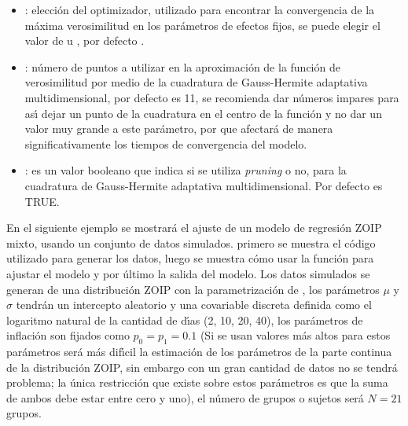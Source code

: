 \begin{itemize}[noitemsep, nolistsep]
.
\item {}: elecci\'{o}n del optimizador, utilizado para encontrar la convergencia de la m\'{a}xima verosimilitud en los par\'{a}metros de efectos fijos, se puede elegir el valor de  u , por defecto .
\item {}: n\'{u}mero de puntos a utilizar en la aproximaci\'{o}n de la funci\'{o}n de ve\-ro\-si\-mi\-li\-tud por medio de la cuadratura de Gauss-Hermite adaptativa multidimensional, por defecto es 11, se recomienda dar n\'{u}meros impares para as\'{\i} dejar un punto de la cuadratura en el centro de la funci\'{o}n y no dar un valor muy grande a este par\'{a}metro, por que afectar\'{a} de manera significativamente los tiempos de convergencia del modelo.
\item {}: es un valor booleano que indica si se utiliza \textit{pruning} o no, para la cuadratura de Gauss-Hermite adaptativa multidimensional. Por defecto es TRUE.
\end{itemize}
En el siguiente ejemplo se mostrar\'{a} el ajuste de un modelo de regresi\'{o}n ZOIP mixto, usando un conjunto de datos simulados. primero se muestra el c\'{o}digo utilizado para generar los datos, luego se muestra c\'{o}mo usar la funci\'{o}n  para ajustar el modelo y por \'{u}ltimo la salida del modelo. Los datos simulados se generan de una distribuci\'{o}n ZOIP con la parametrizaci\'{o}n de \cite{Stasinopoulos2}, los par\'{a}metros $\mu$ y $\sigma$ tendr\'{a}n un intercepto aleatorio y una covariable discreta definida como el logaritmo natural de la cantidad de d\'{\i}as (2, 10, 20, 40), los par\'{a}metros de inflaci\'{o}n son fijados como $p_0=p_1=0.1$ (Si se usan valores m\'{a}s altos para estos par\'{a}metros ser\'{a} m\'{a}s dif\'{\i}cil la estimaci\'{o}n de los par\'{a}metros de la parte continua de la distribuci\'{o}n ZOIP, sin embargo con un gran cantidad de datos no se tendr\'{a} problema; la \'{u}nica restricci\'{o}n que existe sobre estos par\'{a}metros es que la suma de ambos debe estar entre cero y uno), el n\'{u}mero de grupos o sujetos ser\'{a} $N=21$ grupos.

